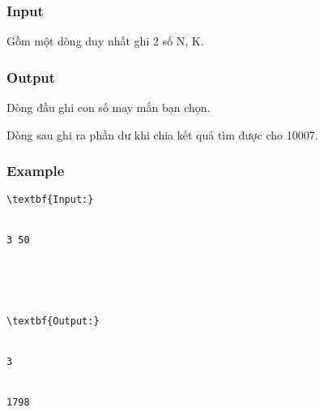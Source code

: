 \subsubsection{   Input  }

   Gồm một dòng duy nhất ghi 2 số N, K.  

\subsubsection{   Output  }

   Dòng đầu ghi con số may mắn bạn chọn.   


   Dòng sau ghi ra phần dư khi chia kết quả tìm được cho 10007.  

\subsubsection{   Example  }
\begin{verbatim}
\textbf{Input:}


3 50





\textbf{Output:}


3


1798\end{verbatim}

